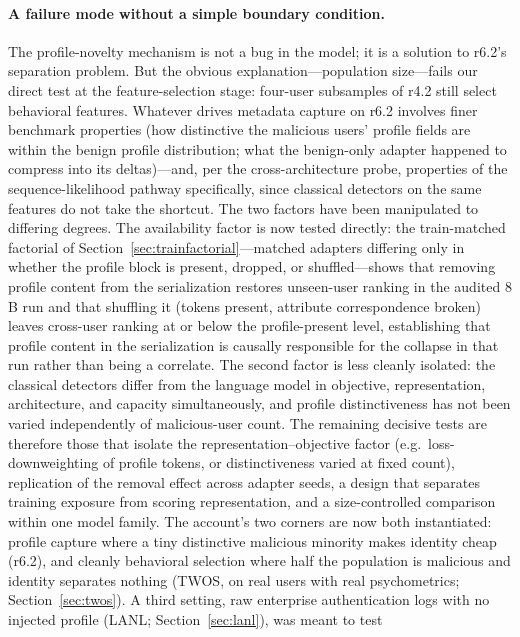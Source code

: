 \documentclass[10pt]{article} %
\newcommand{\rsix}{r6.2}
\newcommand{\rfour}{r4.2}
\begin{document}
\paragraph{A failure mode without a simple boundary condition.}
The profile-novelty mechanism is not a bug in the model; it is a solution to
\rsix{}'s separation problem. But the obvious explanation---population
size---fails our direct test at the feature-selection stage: four-user
subsamples of \rfour{} still select
behavioral features. Whatever drives metadata capture on \rsix{} involves
finer benchmark properties (how distinctive the malicious users' profile
fields are within the benign profile distribution; what the benign-only
adapter happened to compress into its deltas)---and, per the
cross-architecture probe, properties of the sequence-likelihood pathway
specifically, since classical detectors on the same features do not take
the shortcut. The two factors have been manipulated to differing degrees. The
availability factor is now tested directly: the train-matched factorial of
Section~\ref{sec:trainfactorial}---matched adapters differing only in whether
the profile block is present, dropped, or shuffled---shows that removing profile content from the serialization restores
unseen-user ranking in the audited $8$B run and that shuffling it (tokens
present, attribute correspondence broken) leaves cross-user ranking at or
below the profile-present level, establishing that profile content in the
serialization is causally responsible for the collapse in that run rather
than being a correlate. The second factor is less cleanly
isolated: the classical detectors differ from the language model in objective,
representation, architecture, and capacity simultaneously, and profile
distinctiveness has not been varied independently of malicious-user count.
The remaining decisive tests are therefore those that isolate the
representation--objective factor (e.g.\ loss-downweighting of profile tokens,
or distinctiveness varied at fixed count), replication of the removal effect across adapter seeds, a design that
separates training exposure from scoring representation, and a
size-controlled comparison within one model family. The account's two corners
are now both instantiated: profile capture where a tiny distinctive
malicious minority makes identity cheap (\rsix{}), and cleanly behavioral
selection where half the population is malicious and identity separates
nothing (TWOS, on real users with real psychometrics;
Section~\ref{sec:twos}). A third setting, raw enterprise authentication logs
with no injected profile (LANL; Section~\ref{sec:lanl}), was meant to test
\end{document}
